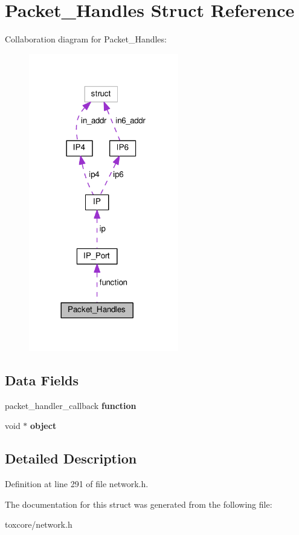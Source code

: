 \hypertarget{struct_packet___handles}{\section{Packet\+\_\+\+Handles Struct Reference}
\label{struct_packet___handles}
}


Collaboration diagram for Packet\+\_\+\+Handles\+:
\nopagebreak
\begin{figure}[H]
\begin{center}
\leavevmode
\includegraphics[width=185pt]{struct_packet___handles__coll__graph}
\end{center}
\end{figure}
\subsection*{Data Fields}
\begin{DoxyCompactItemize}
\item 
\hypertarget{struct_packet___handles_a197979c60c06b39ac717b08f5091dd0e}{packet\+\_\+handler\+\_\+callback {\bfseries function}}\label{struct_packet___handles_a197979c60c06b39ac717b08f5091dd0e}

\item 
\hypertarget{struct_packet___handles_a077376d12464f945e2414d5499c79b3f}{void $\ast$ {\bfseries object}}\label{struct_packet___handles_a077376d12464f945e2414d5499c79b3f}

\end{DoxyCompactItemize}


\subsection{Detailed Description}


Definition at line 291 of file network.\+h.



The documentation for this struct was generated from the following file\+:\begin{DoxyCompactItemize}
\item 
toxcore/network.\+h\end{DoxyCompactItemize}
